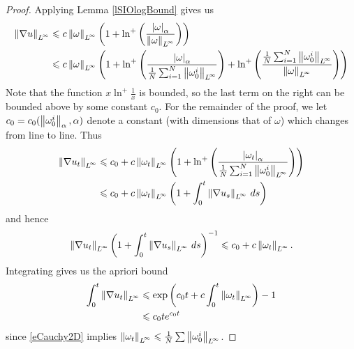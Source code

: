 \documentclass[final]{amsart}%
\newcommand{\inv}{^{-1}}
\newcommand{\grad}{\nabla}
\renewcommand{\epsilon}{\varepsilon}
\renewcommand{\leq}{\leqslant}
\newif\iftextstyle
\newcommand{\abs}[1]{\iftextstyle\lvert#1\rvert\else\left\lvert#1\right\rvert\fi}
\newcommand{\norm}[1]{\iftextstyle\lVert#1\rVert\else\left\lVert#1\right\rVert\fi}
\newcommand{\holdernorm}[3]{\norm{#1}_{\ifx0#2{#3}\else{#2,#3}\fi}}
\newcommand{\holdersnorm}[2]{\abs{#1}_{#2}}
\newcommand{\lpnorm}[2]{\norm{#1}_{\smash{L^{\!#2}_{\vphantom{h}}}\vphantom{L^{\!#2}}}}
\newcommand{\linfnorm}[1]{\lpnorm{#1}{\infty}}
\numberwithin{equation}{section}
\theoremstyle{definition}
\theoremstyle{remark}
\begin{document}
\begin{proof}
Applying Lemma \ref{lSIOlogBound} gives us
\begin{align*}
  \linfnorm{ \grad u } &\leq c \linfnorm{\omega} \left( 1 +
    \ln^+\left( \frac{\holdersnorm{\omega}{\alpha}
      }{\linfnorm{\omega}}\right) \right)\\ 
  &\leq c \linfnorm{\omega} \left( 1 + \ln^+\left(
      \frac{\holdersnorm{\omega}{\alpha} }{\frac{1}{N} \sum_{i=1}^N
        \linfnorm{\omega^i_0}}\right) + \ln^+\left(
      \frac{\frac{1}{N}\sum_{i=1}^N \linfnorm{\omega^i_0}
      }{\linfnorm{\omega}}\right) \right)
\end{align*}
%
Note that the function $x \ln^+ \frac{1}{x}$ is bounded, so the last
term on the right can be bounded above by some constant $c_0$. For the
remainder of the proof, we let $c_0 = c_0(
\holdernorm{\omega^i_0}{0}{\alpha}, \alpha)$ denote a constant (with
dimensions that of $\omega$) which changes from line to line. Thus
\begin{align*}
  \linfnorm{\grad u_t} &\leq c_0 + c \linfnorm{\omega_t} \left( 1 +
    \ln^+\left( \frac{\holdersnorm{\omega_t}{\alpha} }{\frac{1}{N}
        \sum_{i=1}^N \linfnorm{\omega^i_0}}\right) \right)\\ 
  &\leq c_0 + c \linfnorm{\omega_t} \left( 1 + \int_0^t
    \linfnorm{\grad u_s} \, ds \right)
\end{align*}
and hence
$$
\linfnorm{\grad u_t} \left( 1 + \int_0^t \linfnorm{\grad u_s} \, ds
\right)\inv \leq c_0 + c \linfnorm{\omega_t}.
$$
Integrating gives us the apriori bound
\begin{align}
  \nonumber \int_0^t \linfnorm{\grad u_t} &\leq \exp\left(c_0 t + c
    \int_0^t \linfnorm{\omega_t} \right) - 1\\ 
\label{eAprioriIntGradULinf}    &\leq c_0 t e^{c_0 t}
\end{align}
since \eqref{eCauchy2D} implies $\linfnorm{\omega_t} \leq \frac{1}{N}
\sum \linfnorm{\omega^i_0}$. 


\end{proof}
\end{document}
